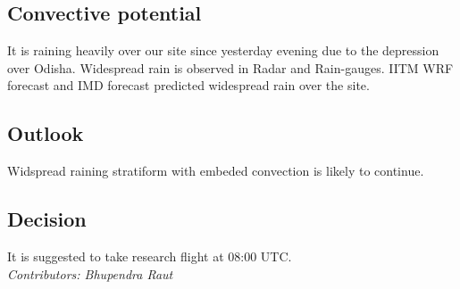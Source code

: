 \subsection*{Convective potential}
It is raining heavily over our site since yesterday evening due to the depression over Odisha. Widespread rain is observed in Radar and Rain-gauges. IITM WRF forecast and IMD forecast predicted widespread rain over the site. 

\subsection*{Outlook}
Widspread raining stratiform with embeded convection is likely to continue.\\
\subsection*{Decision}
It is suggested to take research flight at 08:00 UTC.\\ 



\textit{Contributors: Bhupendra Raut} 

